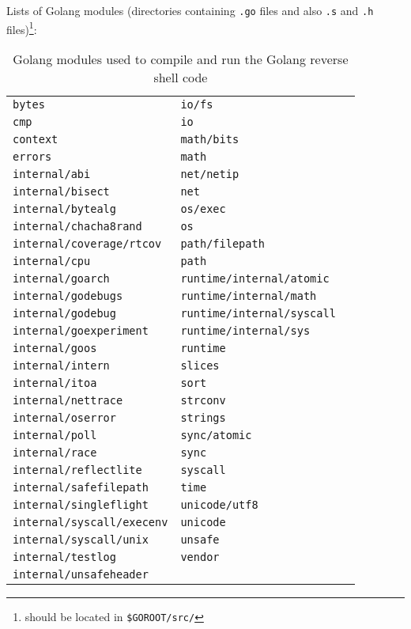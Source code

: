 Lists of Golang modules (directories containing \texttt{.go} files and also \texttt{.s} and \texttt{.h} files)\footnote{should be located in \texttt{\$GOROOT/src/}}:

\begin{longtable}{l l l }
\caption{Golang modules used to compile and run the Golang reverse shell code}\label{tab:go-dpd} \\
\texttt{bytes} & \texttt{io/fs} \\
\texttt{cmp} & \texttt{io} \\
\texttt{context} & \texttt{math/bits} \\
\texttt{errors} & \texttt{math} \\
\texttt{internal/abi} & \texttt{net/netip} \\
\texttt{internal/bisect} & \texttt{net} \\
\texttt{internal/bytealg} & \texttt{os/exec} \\
\texttt{internal/chacha8rand} & \texttt{os} \\
\texttt{internal/coverage/rtcov} & \texttt{path/filepath} \\
\texttt{internal/cpu} & \texttt{path} \\
\texttt{internal/goarch} & \texttt{runtime/internal/atomic} \\
\texttt{internal/godebugs} & \texttt{runtime/internal/math} \\
\texttt{internal/godebug} & \texttt{runtime/internal/syscall} \\
\texttt{internal/goexperiment} & \texttt{runtime/internal/sys} \\
\texttt{internal/goos} & \texttt{runtime} \\
\texttt{internal/intern} & \texttt{slices} \\
\texttt{internal/itoa} & \texttt{sort} \\
\texttt{internal/nettrace} & \texttt{strconv} \\
\texttt{internal/oserror} & \texttt{strings} \\
\texttt{internal/poll} & \texttt{sync/atomic} \\
\texttt{internal/race} & \texttt{sync} \\
\texttt{internal/reflectlite} & \texttt{syscall} \\
\texttt{internal/safefilepath} & \texttt{time} \\
\texttt{internal/singleflight} & \texttt{unicode/utf8} \\
\texttt{internal/syscall/execenv} & \texttt{unicode} \\
\texttt{internal/syscall/unix} & \texttt{unsafe} \\
\texttt{internal/testlog} & \texttt{vendor} \\
\texttt{internal/unsafeheader} & \\
\end{longtable}
